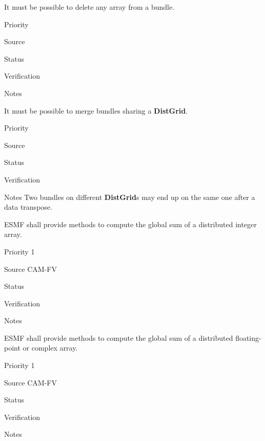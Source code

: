 It must be possible to delete any array from a bundle.

\begin{reqlist}
\item[Priority]
\item[Source] 
\item[Status]
\item[Verification]
\item[Notes]
\end{reqlist}


It must be possible to merge bundles sharing a \textbf{DistGrid}.

\begin{reqlist}
\item[Priority]
\item[Source]
\item[Status]
\item[Verification]
\item[Notes] Two bundles on different \textbf{DistGrid}s may end up on the same
  one after a data transpose.
\end{reqlist}



ESMF shall provide methods to compute the global sum of a distributed
integer array.

\begin{reqlist}
\item[Priority] 1
\item[Source] CAM-FV
\item[Status]
\item[Verification]
\item[Notes] 
\end{reqlist}



ESMF shall provide methods to compute the global sum of a distributed
floating-point or complex array.

\begin{reqlist}
\item[Priority] 1
\item[Source] CAM-FV
\item[Status]
\item[Verification]
\item[Notes]
\end{reqlist}

 \label{DG:masksum}

